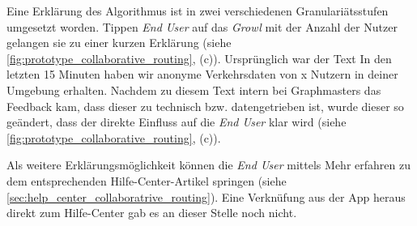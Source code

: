 Eine Erklärung des Algorithmus ist in zwei verschiedenen Granulariätsstufen umgesetzt worden. Tippen \textit{End User} auf das \textit{Growl} mit der Anzahl der Nutzer gelangen sie zu einer kurzen Erklärung (siehe \autoref{fig:prototype_collaborative_routing}, (c)). Ursprünglich war der Text \glqq In den letzten 15 Minuten haben wir anonyme Verkehrsdaten von x Nutzern in deiner Umgebung erhalten\grqq{}. Nachdem zu diesem Text intern bei Graphmasters das Feedback kam, dass dieser zu technisch bzw. datengetrieben ist, wurde dieser so geändert, dass der direkte Einfluss auf die \textit{End User} klar wird (siehe \autoref{fig:prototype_collaborative_routing}, (c)).

Als weitere Erklärungsmöglichkeit können die \textit{End User} mittels \glqq Mehr erfahren\grqq{} zu dem entsprechenden Hilfe-Center-Artikel springen (siehe \autoref{sec:help_center_collaboratrive_routing}). Eine Verknüfung aus der App heraus direkt zum Hilfe-Center gab es an dieser Stelle noch nicht.

